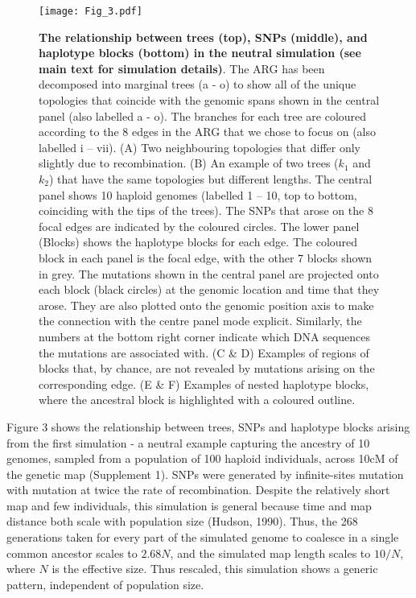 \documentclass[twocolumn]{bmcart}%
\begin{document}
\begin{figure}[h]
    \texttt{[image: Fig\_3.pdf]}
    \caption{\footnotesize{\textbf{The relationship between trees (top), SNPs (middle), and haplotype blocks (bottom) in the neutral simulation (see main text for simulation details)}. The ARG has been decomposed into marginal trees (a - o) to show all of the unique topologies that coincide with the genomic spans shown in the central panel (also labelled a - o). The branches for each tree are coloured according to the 8 edges in the ARG that we chose to focus on (also labelled i – vii).  (A) Two neighbouring topologies that differ only slightly due to recombination. (B) An example of two trees ($k_1$ and $k_2$) that have the same topologies but different lengths. The central panel shows 10 haploid genomes (labelled 1 – 10, top to bottom, coinciding with the tips of the trees). The SNPs that arose on the 8 focal edges are indicated by the coloured circles. The lower panel (Blocks) shows the haplotype blocks for each edge. The coloured block in each panel is the focal edge, with the other 7 blocks shown in grey. The mutations shown in the central panel are projected onto each block (black circles) at the genomic location and time that they arose. They are also plotted onto the genomic position axis to make the connection with the centre panel mode explicit. Similarly, the numbers at the bottom right corner indicate which DNA sequences the mutations are associated with. (C \& D) Examples of regions of blocks that, by chance, are not revealed by mutations arising on the corresponding edge. (E \& F) Examples of nested haplotype blocks, where the ancestral block is highlighted with a coloured outline.}}
    \label{fig:2}
\end{figure}

Figure 3 shows the relationship between trees, SNPs and haplotype blocks arising from the first simulation - a neutral example capturing the ancestry of 10 genomes, sampled from a population of 100 haploid individuals, across 10cM of the genetic map (Supplement 1). SNPs were generated by infinite-sites mutation with mutation at twice the rate of recombination. Despite the relatively short map and few individuals, this simulation is general because time and map distance both scale with population size (Hudson, 1990). Thus, the 268 generations taken for every part of the simulated genome to coalesce in a single common ancestor scales to $2.68N$, and the simulated map length scales to $10/N$, where $N$ is the effective size. Thus rescaled, this simulation shows a generic pattern, independent of population size. 
\end{document}
